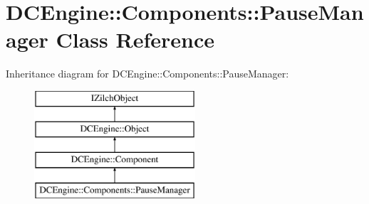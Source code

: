 \hypertarget{classDCEngine_1_1Components_1_1PauseManager}{\section{D\-C\-Engine\-:\-:Components\-:\-:Pause\-Manager Class Reference}
\label{classDCEngine_1_1Components_1_1PauseManager}
}
Inheritance diagram for D\-C\-Engine\-:\-:Components\-:\-:Pause\-Manager\-:\begin{figure}[H]
\begin{center}
\leavevmode
\includegraphics[height=4.000000cm]{classDCEngine_1_1Components_1_1PauseManager}
\end{center}
\end{figure}

